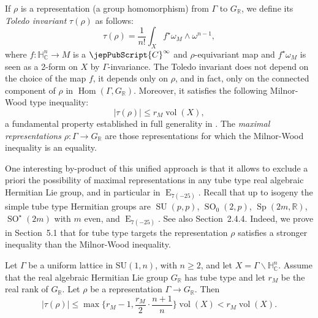 If $\rho$ is a representation (a group homomorphism) from $\Gamma$ to $G_{\mathbb R}$, we define its \emph{Toledo invariant} $\tau(\rho)$ as follows:
\[
\tau(\rho)=\frac1{n!}\int_X f^{\star}\omega_M\wedge\omega^{n-1},
\]
where $f:\mathbb H^n_{\mathbb C}\to M$ is a $\jepPubScript{C}^{\infty}$ and $\rho$-equivariant map and $f^{\star}\omega_M$ is seen as a 2-form on $X$ by $\Gamma$-invariance. The Toledo invariant does not depend on the choice of the map $f$, it depends only on $\rho$, and in fact, only on the connected component of $\rho$ in $\operatorname{Hom}(\Gamma,G_{\mathbb R})$. Moreover, it satisfies the following Milnor-Wood type inequality:
\[
|\tau(\rho)|\leqslant r_M\operatorname{vol}(X),
\]
a fundamental property established in full generality in \cite{jep93BI07}.
The \emph{maximal representations} $\rho:\Gamma\to G_{\mathbb R}$ are those representations for which the Milnor-Wood inequality is an equality.

One interesting by-product of this unified approach is that it allows to exclude a priori the possibility of maximal representations in any tube type real algebraic Hermitian Lie group, and in particular in $\operatorname E_{7(-25)}$. Recall that up to isogeny the simple tube type Hermitian groups are $\operatorname{SU}(p,p)$, $\operatorname{SO}_0(2,p)$, $\operatorname{Sp}(2m,\mathbb R)$, $\operatorname{SO}^{\star}(2m)$ with $m$ even, and $\operatorname E_{7(-25)}$. See also Section~2.4.4. Indeed, we prove in Section~5.1 that for tube type targets the representation $\rho$ satisfies a stronger inequality than the Milnor-Wood inequality.
\begin{propositionC}
Let $\Gamma$ be a uniform lattice in $\mathrm{SU}(1,n)$, with $n\geqslant2$, and let $X=\Gamma\backslash\mathbb H^n_{\mathbb C}$. Assume that the real algebraic Hermitian Lie group $G_{\mathbb R}$ has tube type and let $r_M$ be the real rank of $G_{\mathbb R}$. Let $\rho$ be a representation $\Gamma\to G_{\mathbb R}$. Then
\[
|\tau(\rho)|\leqslant\max\Big\{r_M-1,\frac{r_M}{2}\cdot\frac{n+1}{n}\Big\}\operatorname{vol}(X)<r_M\operatorname{vol}(X).
\]
\end{propositionC}

